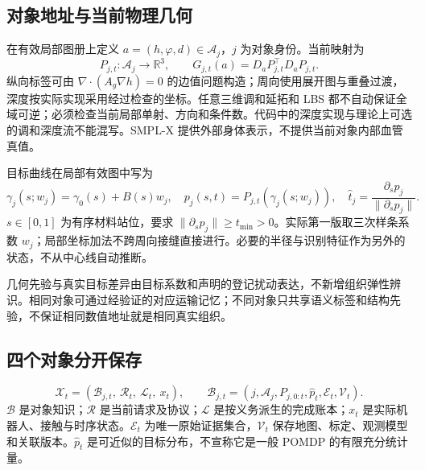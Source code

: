 \documentclass[UTF8,11pt,a4paper,fontset=fandol]{ctexart}
\numberwithin{equation}{section}
\theoremstyle{definition}
\begin{document}
\subsection{对象地址与当前物理几何}
在有效局部图册上定义 $a=(h,\varphi,d)\in\mathcal A_j$，$j$ 为对象身份。当前映射为
\begin{equation}
P_{j,t}:\mathcal A_j\rightarrow\mathbb R^3,\qquad
G_{j,t}(a)=D_aP_{j,t}^{\top}D_aP_{j,t}.
\label{eq:map}
\end{equation}
纵向标签可由 $\nabla\cdot(A_g\nabla h)=0$ 的边值问题构造；周向使用展开图与重叠过渡，深度按实际实现采用经过检查的坐标。任意三维调和延拓和 LBS 都不自动保证全域可逆；必须检查当前局部单射、方向和条件数。代码中的深度实现与理论上可选的调和深度流不能混写。SMPL-X 提供外部身体表示，不提供当前对象内部血管真值\cite{smplx,repoversions}。

目标曲线在局部有效图中写为
\begin{equation}
\gamma_j(s;w_j)=\gamma_0(s)+B(s)w_j,\quad
p_j(s,t)=P_{j,t}(\gamma_j(s;w_j)),\quad
\widehat t_j=\frac{\partial_sp_j}{\|\partial_sp_j\|}.
\label{eq:target}
\end{equation}
$s\in[0,1]$ 为有序材料站位，要求 $\|\partial_sp_j\|\ge t_{\min}>0$。实际第一版取三次样条系数 $w_j$；局部坐标加法不跨周向接缝直接进行。必要的半径与识别特征作为另外的状态，不从中心线自动推断。

几何先验与真实目标差异由目标系数和声明的登记扰动表达，不新增组织弹性辨识。相同对象可通过经验证的对应运输记忆；不同对象只共享语义标签和结构先验，不保证相同数值地址就是相同真实组织。

\subsection{四个对象分开保存}
\begin{equation}
\mathcal X_t=(\mathcal B_{j,t},\ \mathcal R_t,\ \mathcal L_t,\ x_t),
\qquad
\mathcal B_{j,t}=(j,\mathcal A_j,P_{j,0:t},\widehat p_t,\mathcal E_t,\mathcal V_t).
\label{eq:state}
\end{equation}
$\mathcal B$ 是对象知识；$\mathcal R$ 是当前请求及协议；$\mathcal L$ 是按义务派生的完成账本；$x_t$ 是实际机器人、接触与时序状态。$\mathcal E_t$ 为唯一原始证据集合，$\mathcal V_t$ 保存地图、标定、观测模型和关联版本。$\widehat p_t$ 是可近似的目标分布，不宣称它是一般 POMDP 的有限充分统计量。
\end{document}
